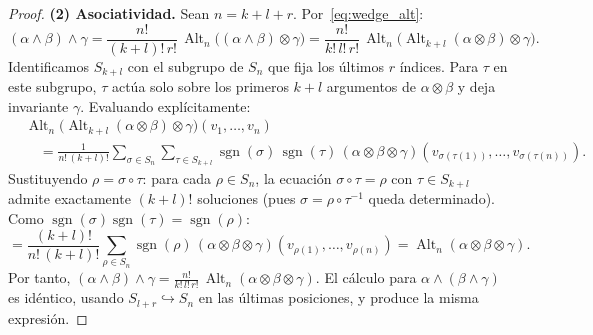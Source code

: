 \begin{proof}
\textbf{(2) Asociatividad.} Sean $n = k+l+r$. Por~\eqref{eq:wedge_alt}:
\[
(\alpha \wedge \beta) \wedge \gamma = \frac{n!}{(k{+}l)!\,r!}\,\operatorname{Alt}_n\!\big((\alpha \wedge \beta) \otimes \gamma\big) = \frac{n!}{k!\,l!\,r!}\,\operatorname{Alt}_n\!\big(\operatorname{Alt}_{k+l}(\alpha \otimes \beta) \otimes \gamma\big).
\]
Identificamos $S_{k+l}$ con el subgrupo de $S_n$ que fija los últimos $r$ índices. Para $\tau$ en este subgrupo, $\tau$ actúa solo sobre los primeros $k+l$ argumentos de $\alpha \otimes \beta$ y deja invariante $\gamma$. Evaluando explícitamente:
\begin{align*}
&\operatorname{Alt}_n\!\big(\operatorname{Alt}_{k+l}(\alpha \otimes \beta) \otimes \gamma\big)(v_1, \ldots, v_n) \\
  &\quad= \frac{1}{n!\,(k{+}l)!}\sum_{\sigma \in S_n}\sum_{\tau \in S_{k+l}}\operatorname{sgn}(\sigma)\,\operatorname{sgn}(\tau)\,(\alpha \otimes \beta \otimes \gamma)(v_{\sigma(\tau(1))}, \ldots, v_{\sigma(\tau(n))}).
\end{align*}
Sustituyendo $\rho = \sigma \circ \tau$: para cada $\rho \in S_n$, la ecuación $\sigma \circ \tau = \rho$ con $\tau \in S_{k+l}$ admite exactamente $(k{+}l)!$ soluciones (pues $\sigma = \rho \circ \tau^{-1}$ queda determinado). Como $\operatorname{sgn}(\sigma)\operatorname{sgn}(\tau) = \operatorname{sgn}(\rho)$:
\[
= \frac{(k{+}l)!}{n!\,(k{+}l)!}\sum_{\rho \in S_n}\operatorname{sgn}(\rho)\,(\alpha \otimes \beta \otimes \gamma)(v_{\rho(1)}, \ldots, v_{\rho(n)}) = \operatorname{Alt}_n(\alpha \otimes \beta \otimes \gamma).
\]
Por tanto, $(\alpha \wedge \beta) \wedge \gamma = \frac{n!}{k!\,l!\,r!}\,\operatorname{Alt}_n(\alpha \otimes \beta \otimes \gamma)$. El cálculo para $\alpha \wedge (\beta \wedge \gamma)$ es idéntico, usando $S_{l+r} \hookrightarrow S_n$ en las últimas posiciones, y produce la misma expresión.
\end{proof}


